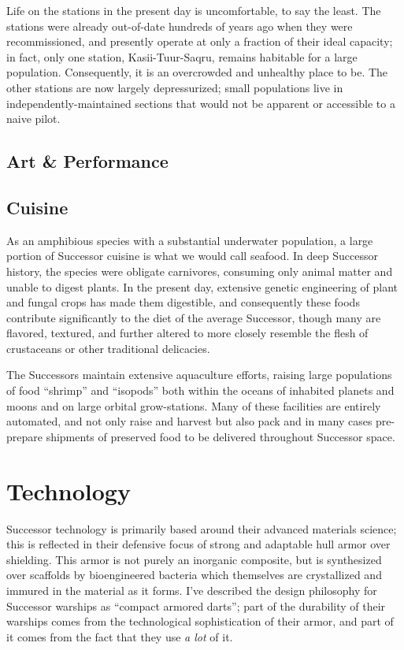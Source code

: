 \documentclass[11pt]{report}
\begin{document}
    Life on the stations in the present day is uncomfortable, to say the least. The stations were already out-of-date hundreds of years ago when they were recommissioned, and presently operate at only a fraction of their ideal capacity; in fact, only one station, Kasii-Tuur-Saqru, remains habitable for a large population. Consequently, it is an overcrowded and unhealthy place to be. The other stations are now largely depressurized; small populations live in independently-maintained sections that would not be apparent or accessible to a naive pilot.

    \subsection{Art \& Performance}
    \subsection{Cuisine}
    As an amphibious species with a substantial underwater population, a large portion of Successor cuisine is what we would call seafood. In deep Successor history, the species were obligate carnivores, consuming only animal matter and unable to digest plants. In the present day, extensive genetic engineering of plant and fungal crops has made them digestible, and consequently these foods contribute significantly to the diet of the average Successor, though many are flavored, textured, and further altered to more closely resemble the flesh of crustaceans or other traditional delicacies.

    The Successors maintain extensive aquaculture efforts, raising large populations of food ``shrimp'' and ``isopods'' both within the oceans of inhabited planets and moons and on large orbital grow-stations. Many of these facilities are entirely automated, and not only raise and harvest but also pack and in many cases pre-prepare shipments of preserved food to be delivered throughout Successor space.
    
    \section{Technology}
    Successor technology is primarily based around their advanced materials science; this is reflected in their defensive focus of strong and adaptable hull armor over shielding. This armor is not purely an inorganic composite, but is synthesized over scaffolds by bioengineered bacteria which themselves are crystallized and immured in the material as it forms. I've described the design philosophy for Successor warships as ``compact armored darts''; part of the durability of their warships comes from the technological sophistication of their armor, and part of it comes from the fact that they use \emph{a lot} of it.
\end{document}
